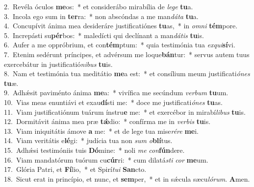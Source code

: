 {2.~}Revéla óculos \textbf{me}os:~* et considerábo mirabília de \textit{le}\textit{ge} \textbf{tu}a.\\
{3.~}Incola ego sum in \textbf{ter}ra:~* non abscóndas a me man\textit{dá}\textit{ta} \textbf{tu}a.\\
{4.~}Concupívit ánima mea desideráre justificatiónes \textbf{tu}as,~* in \textit{om}\textit{ni} \textbf{tém}pore.\\
{5.~}Increpásti su\textbf{pér}bos:~* maledícti qui declínant a man\textit{dá}\textit{tis} \textbf{tu}is.\\
{6.~}Aufer a me oppróbrium, et con\textbf{tém}ptum:~* quia testimónia tua \textit{ex}\textit{qui}\textbf{sí}vi.\\
{7.~}Etenim sedérunt príncipes, et advérsum me loque\textbf{bán}tur:~* servus autem tuus exercebátur in justificatió\textit{ni}\textit{bus} \textbf{tu}is.\\
{8.~}Nam et testimónia tua meditátio \textbf{me}a est:~* et consílium meum justificati\textit{ó}\textit{nes} \textbf{tu}æ.\\
{9.~}Adhǽsit paviménto ánima \textbf{me}a:~* vivífica me secúndum \textit{ver}\textit{bum} \textbf{tu}um.\\
{10.~}Vias meas enuntiávi et exau\textbf{dí}sti me:~* doce me justificati\textit{ó}\textit{nes} \textbf{tu}as.\\
{11.~}Viam justificatiónum tuárum ínstru\textbf{e} me:~* et exercébor in mirabí\textit{li}\textit{bus} \textbf{tu}is.\\
{12.~}Dormitávit ánima mea præ \textbf{tǽ}dio:~* confírma me in \textit{ver}\textit{bis} \textbf{tu}is.\\
{13.~}Viam iniquitátis ámove \textbf{a} me:~* et de lege tua mise\textit{ré}\textit{re} \textbf{me}i.\\
{14.~}Viam veritátis e\textbf{lé}gi:~* judícia tua non \textit{sum} \textit{o}\textbf{blí}tus.\\
{15.~}Adhǽsi testimóniis tuis \textbf{Dó}mine:~* noli \textit{me} \textit{con}\textbf{fún}dere.\\
{16.~}Viam mandatórum tuórum cu\textbf{cúr}ri:~* cum dilatá\textit{sti} \textit{cor} \textbf{me}um.\\
{17.~}Glória Patri, et \textbf{Fí}lio,~* et Spirí\textit{tu}\textit{i} \textbf{San}cto.\\
{18.~}Sicut erat in princípio, et nunc, et \textbf{sem}per,~* et in sǽcula sæcu\textit{ló}\textit{rum}. \textbf{A}men.\\

